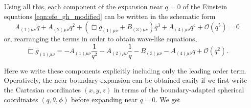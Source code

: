 \documentclass[a4paper,11pt]{article}
\numberwithin{equation}{section}
\begin{document}
Using all this, each component of the expansion near $q=0$ of the Einstein equations \eqref{eqn:efe_gh_modified} can be written in the schematic form
\begin{equation}\label{eq:efefullexp}
A_{(1)\mu\nu}q+A_{(2)\mu\nu}q^2+(\tilde{\Box}\bar{g}_{(1)\mu\nu}+B_{(3)\mu\nu})q^3+A_{(4)\mu\nu}q^4+\mathcal{O}(q^5)=0
\end{equation}
or, rearranging the terms in order to obtain wave-like equations,
\begin{equation}
\tilde{\Box}\bar{g}_{(1)\mu\nu}=-A_{(1)\mu\nu}\frac{1}{q^2}-A_{(2)\mu\nu}\frac{1}{q}-B_{(3)\mu\nu}-A_{(4)\mu\nu}q+\mathcal{O}(q^2).
\end{equation}

Here we write these components explicitly including only the leading order term. Operatively, the near-boundary expansion can be obtained easily if we first write the Cartesian coordinates $(x,y,z)$ in terms of the boundary-adapted spherical coordinates $(q,\theta,\phi)$ before expanding near $q=0$. We get
\end{document}
